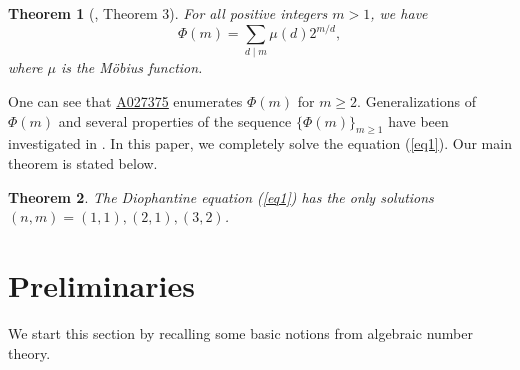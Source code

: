 \documentclass[12pt,reqno]{amsart}
\newtheorem{theorem}{Theorem}[section]
\begin{document}
\begin{theorem}[\cite{Nath}, Theorem 3] \label{Nathanson Theorem}For all positive integers $m>1$, we have
    $$\Phi(m) = \sum_{d \mid m} \mu(d) 2^{m/d},$$
    where $\mu$ is the Möbius function. 
\end{theorem}
\noindent One can see that \href{https://oeis.org/A027375}{\underline{A027375}} enumerates $\Phi(m)$ for $m\geq2$. Generalizations of $\Phi(m)$ and several properties of the sequence $\{\Phi(m)\}_{m\geq1}$ have been investigated in \cite{T1,T2,T3,T4,Tmm,T5,T6}.
In this paper, we completely solve the equation (\ref{eq1}). Our main theorem is stated below. 
\begin{theorem}\label{Thm1}
The Diophantine equation (\ref{eq1}) has the only  solutions $(n,m)=(1,1),(2,1),(3,2)$.
\end{theorem}
\section{Preliminaries}
We start this section by recalling some basic notions from algebraic number theory.
\end{document}
